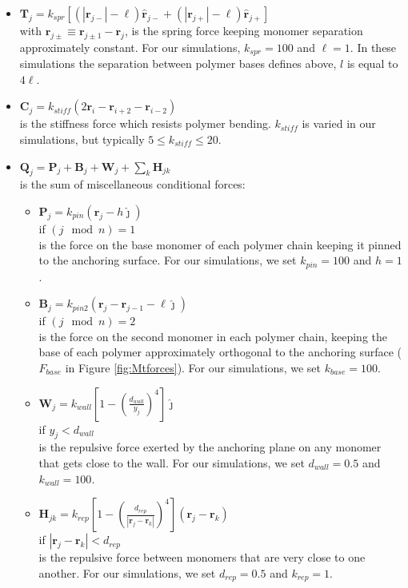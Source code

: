 \documentclass[11pt]{ucthesis}
\begin{document}
\begin{itemize}
\item $\mathbf{T}_j = k_{spr}\left[\left(|\mathbf{r}_{j-}|-\ell\right)\hat{\mathbf{r}}_{j-} + \left(|\mathbf{r}_{j+}|-\ell\right)\hat{\mathbf{r}}_{j+} \right]$\\
with $\mathbf{r}_{j\pm}\equiv \mathbf{r}_{j\pm 1} - \mathbf{r}_j$, is the spring force keeping monomer separation approximately constant. For our simulations, $k_{spr}=100$ and $\ell=1$.
In these simulations the separation between polymer bases defines above, $l$ is equal to $4\ell$.
\item $\mathbf{C}_j = k_{stiff}\left(2\textbf{r}_i - \textbf{r}_{i+2} - \textbf{r}_{i-2}\right)$\\
is the stiffness force which resists polymer bending. $k_{stiff}$ is varied in our simulations, but typically $5 \leq k_{stiff} \leq 20$.
\item $\mathbf{Q}_j = \mathbf{P}_j + \mathbf{B}_j + \mathbf{W}_j + \sum_k\mathbf{H}_{jk}$\\
is the sum of miscellaneous conditional forces:
\begin{itemize}
\item $\mathbf{P}_j = k_{pin}\left(\mathbf{r}_j - h\boldsymbol{\hat{\jmath}}\right)$\\
\phantom{.}\hfill if $(j \mod n) = 1$\\
is the force on the base monomer of each polymer chain keeping it pinned to the anchoring surface. For our simulations, we set $k_{pin} = 100$ and $h=1$.
\item $\mathbf{B}_j = k_{pin2}\left(\mathbf{r}_j - \mathbf{r}_{j-1} - \ell\boldsymbol{\hat{\jmath}}\right)$\\
\phantom{.}\hfill if $(j \mod n) = 2$\\
is the force on the second monomer in each polymer chain, keeping
the base of each polymer approximately orthogonal to the anchoring
surface ($F_{base}$ in Figure \ref{fig:Mtforces}). For our simulations,
we set $k_{base}=100$.
\item $\mathbf{W}_{j} = k_{wall}\left[1-\left(\frac{d_{wall}}{y_j}\right)^4\right]\boldsymbol{\hat\jmath}$\\
\phantom{.}\hfill if $y_j < d_{wall}$\\
is the repulsive force exerted by the anchoring plane on any monomer that gets close to the wall. For our simulations, we set $d_{wall}=0.5$ and $k_{wall} = 100$.
\item $\mathbf{H}_{jk} = k_{rep}\left[1-\left(\frac{d_{rep}}{|\mathbf{r}_j - \mathbf{r}_k|}\right)^4\right]\left(\mathbf{r}_j - \mathbf{r}_k\right)$\\
\phantom{.}\hfill if $|\mathbf{r}_j-\mathbf{r}_k| < d_{rep}$\\
is the repulsive force between monomers that are very close to one another. For our simulations, we set $d_{rep}=0.5$ and $k_{rep} = 1$.
\end{itemize}
\end{itemize}
\end{document}
